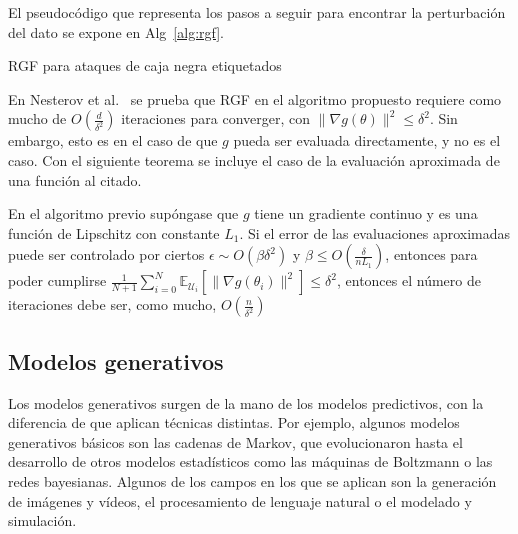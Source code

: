 El pseudocódigo que representa los pasos a seguir para encontrar la perturbación del dato se expone en Alg~\ref{alg:rgf}.

\begin{algorithm}
\caption{RGF para ataques de caja negra etiquetados}\label{alg:rgf}
\BlankLine
{}
\end{algorithm}

En Nesterov et al.~\cite{RGF_FREE} se prueba que RGF en el algoritmo propuesto requiere como mucho de $O \left( \frac{d}{\delta^2} \right)$ iteraciones para converger, con $\| \nabla g(\theta)\|^2 \leq \delta^2$. Sin embargo, esto es en el caso de que $g$ pueda ser evaluada directamente, y no es el caso. Con el siguiente teorema se incluye el caso de la evaluación aproximada de una función al citado.

\begin{teorema}
En el algoritmo previo supóngase que $g$ tiene un gradiente continuo y es una función de Lipschitz con constante $L_1$. Si el error de las evaluaciones aproximadas puede ser controlado por ciertos $\epsilon \sim O(\beta \delta^2)$ y $\beta \leq O \left( \frac{\delta}{nL_1} \right)$, entonces para poder cumplirse $\frac{1}{N+1} \sum_{i=0}^N \mathbb{E}_{\mathcal{U}_i} \left[ \| \nabla g(\theta_i)\|^2 \right] \leq \delta^2$, entonces el número de iteraciones debe ser, como mucho, $O \left( \frac{n}{\delta^2} \right)$
\end{teorema}

\subsection{Modelos generativos}

Los modelos generativos surgen de la mano de los modelos predictivos, con la diferencia de que aplican técnicas distintas. Por ejemplo, algunos modelos generativos básicos son las cadenas de Markov, que evolucionaron hasta el desarrollo de otros modelos estadísticos como las máquinas de Boltzmann o las redes bayesianas. Algunos de los campos en los que se aplican son la generación de imágenes y vídeos, el procesamiento de lenguaje natural o el modelado y simulación.

